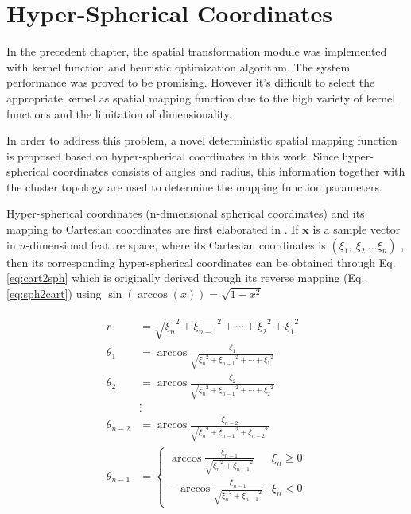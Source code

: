 \section{Hyper-Spherical Coordinates}

In the precedent chapter, the spatial transformation module was implemented with kernel function and heuristic optimization algorithm. The system performance was proved to be promising. However it's difficult to select the appropriate kernel as spatial mapping function due to the high variety of kernel functions and the limitation of dimensionality.

In order to address this problem, a novel deterministic spatial mapping function is proposed based on hyper-spherical coordinates in this work. Since hyper-spherical coordinates consists of angles and radius, this information together with the cluster topology are used to
determine the mapping function parameters.


Hyper-spherical coordinates (n-dimensional spherical coordinates) and its mapping to Cartesian coordinates are first elaborated in \cite{nsphere}. If $\mathbf{x}$ is a sample vector in 
$n$-dimensional feature space, where its Cartesian coordinates is $(\xi_1,~\xi_2~... \xi_n)$ , then its corresponding hyper-spherical coordinates can be obtained through Eq.\ref{eq:cart2sph} which is originally derived through its reverse mapping (Eq.\ref{eq:sph2cart}) using $\sin(\arccos(x)) = \sqrt{1-x^2}$



\begin{align}
\label{eq:cart2sph}
\begin{aligned}
r      &= \sqrt{{\xi_n}^2 + {\xi_{n-1}}^2 + \cdots + {\xi_2}^2 + {\xi_1}^2} \\
\theta_1 &= \arccos \frac{\xi_{1}}{\sqrt{{\xi_n}^2+{\xi_{n-1}}^2+\cdots+{\xi_1}^2}} \\
 \theta_2 &= \arccos \frac{\xi_{2}}{\sqrt{{\xi_n}^2+{\xi_{n-1}}^2+\cdots+{\xi_2}^2}} \\
        &\vdots\\
 \theta_{n-2} &=\arccos \frac{\xi_{n-2}}{\sqrt{{\xi_n}^2+{\xi_{n-1}}^2+{\xi_{n-2}}^2}} \\
 \theta_{n-1} &= 
 \begin{cases}
     \arccos \frac{\xi_{n-1}}{\sqrt{{\xi_n}^2+{\xi_{n-1}}^2}} & \xi_n\geq 0 \\
     - \arccos \frac{\xi_{n-1}}{\sqrt{{\xi_n}^2+{\xi_{n-1}}^2}} & \xi_n < 0
 \end{cases} 
 \end{aligned}
\end{align}


